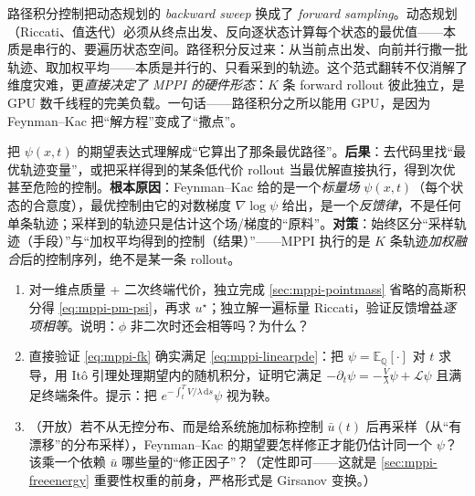 \begin{insight}
路径积分控制把动态规划的 \emph{backward sweep} 换成了 \emph{forward sampling}。动态规划（Riccati、值迭代）必须从终点出发、反向逐状态计算每个状态的最优值——本质是串行的、要遍历状态空间。路径积分反过来：从当前点出发、向前并行撒一批轨迹、取加权平均——本质是并行的、只看采到的轨迹。这个范式翻转不仅消解了维度灾难，更\emph{直接决定了 MPPI 的硬件形态}：$K$ 条 forward rollout 彼此独立，是 GPU 数千线程的完美负载。一句话——路径积分之所以能用 GPU，是因为 Feynman--Kac 把“解方程”变成了“撒点”。
\end{insight}

\begin{pitfall}
把 $\psi(x,t)$ 的期望表达式理解成“它算出了那条最优路径”。\textbf{后果}：去代码里找“最优轨迹变量”，或把采样得到的某条低代价 rollout 当最优解直接执行，得到次优甚至危险的控制。\textbf{根本原因}：Feynman--Kac 给的是一个\emph{标量场} $\psi(x,t)$（每个状态的合意度），最优控制由它的对数梯度 $\nabla\log\psi$ 给出，是一个\emph{反馈律}，不是任何单条轨迹；采样到的轨迹只是估计这个场/梯度的“原料”。\textbf{对策}：始终区分“采样轨迹（手段）”与“加权平均得到的控制（结果）”——MPPI 执行的是 $K$ 条轨迹\emph{加权融合}后的控制序列，绝不是某一条 rollout。
\end{pitfall}

\begin{practice}
\begin{enumerate}
  \item 对一维点质量 + 二次终端代价，独立完成 \cref{sec:mppi-pointmass} 省略的高斯积分得 \cref{eq:mppi-pm-psi}，再求 $u^\star$；独立解一遍标量 Riccati，验证反馈增益\emph{逐项相等}。说明：$\phi$ 非二次时还会相等吗？为什么？
  \item 直接验证 \cref{eq:mppi-fk} 确实满足 \cref{eq:mppi-linearpde}：把 $\psi=\mathbb{E}_{\mathbb{Q}}[\cdot]$ 对 $t$ 求导，用 Itô 引理处理期望内的随机积分，证明它满足 $-\partial_t\psi=-\tfrac{V}{\lambda}\psi+\mathcal{L}\psi$ 且满足终端条件。提示：把 $e^{-\int_t^T V/\lambda\,\mathrm{d}s}\psi$ 视为鞅。
  \item （开放）若不从无控分布、而是给系统施加标称控制 $\bar u(t)$ 后再采样（从“有漂移”的分布采样），Feynman--Kac 的期望要怎样修正才能仍估计同一个 $\psi$？该乘一个依赖 $\bar u$ 哪些量的“修正因子”？（定性即可——这就是 \cref{sec:mppi-freeenergy} 重要性权重的前身，严格形式是 Girsanov 变换。）
\end{enumerate}
\end{practice}

